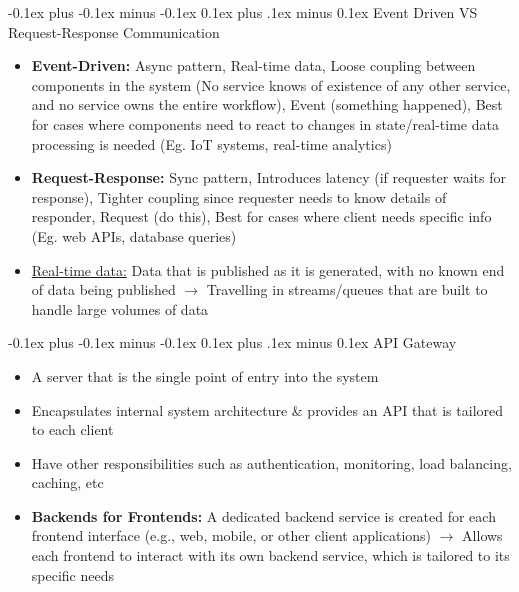 \documentclass[landscape]{article}
\makeatletter
\renewcommand{\subsection}{\@startsection{subsection}{2}{0mm}%
  {-0.1ex plus -0.1ex minus -0.1ex}%
  {0.1ex plus .1ex minus 0.1ex}%
{\normalfont\scriptsize\bfseries}}
\makeatother
\begin{document}
\begin{multicols*}{5}
    \subsection{Event Driven VS Request-Response Communication}
    \begin{itemize}
      \item \textbf{Event-Driven:} Async pattern, Real-time data, Loose coupling between components in the system (No service knows of existence of any other service, and no service owns the entire workflow), Event (something happened), Best for cases where components need to react to changes in state/real-time data processing is needed (Eg. IoT systems, real-time analytics)
      \item \textbf{Request-Response:} Sync pattern, Introduces latency (if requester waits for response), Tighter coupling since requester needs to know details of responder, Request (do this), Best for cases where client needs specific info (Eg. web APIs, database queries)
      \item \underline{Real-time data:} Data that is published as it is generated, with no known end of data being published $\rightarrow$ Travelling in streams/queues that are built to handle large volumes of data
    \end{itemize}

    \subsection{API Gateway}
    \begin{itemize}
      \item A server that is the single point of entry into the system
      \item Encapsulates internal system architecture \& provides an API that is tailored to each client
      \item Have other responsibilities such as authentication, monitoring, load balancing, caching, etc
      \item \textbf{Backends for Frontends:} A dedicated backend service is created for each frontend interface (e.g., web, mobile, or other client applications) $\rightarrow$ Allows each frontend to interact with its own backend service, which is tailored to its specific needs
    \end{itemize}


\end{multicols*}
\end{document}
